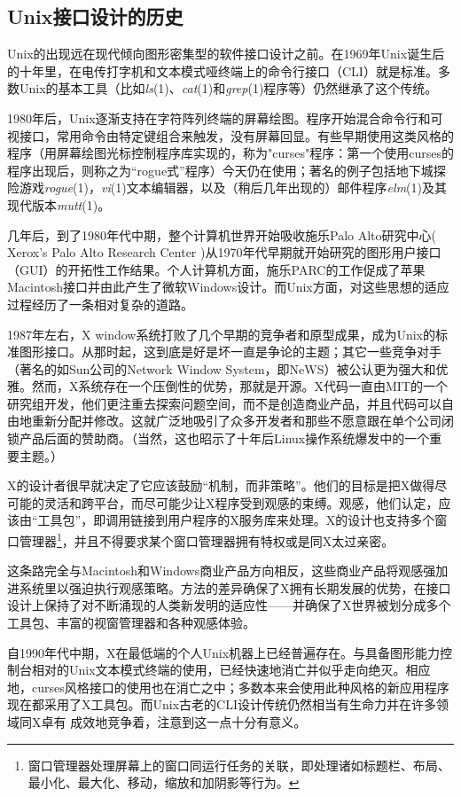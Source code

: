 \documentclass[12pt,oneside]{book}
\begin{document}
\begin{common-format}
\section{Unix接口设计的历史}
Unix的出现远在现代倾向图形密集型的软件接口设计之前。在1969年Unix诞生后的十年里，在电传打字机和文本模式哑终端上的命令行接口（CLI）就是标准。多数Unix的基本工具（比如\textit{ls}(1)、\textit{cat}(1)和\textit{grep}(1)程序等）仍然继承了这个传统。

1980年后，Unix逐渐支持在字符阵列终端的屏幕绘图。程序开始混合命令行和可视接口，常用命令由特定键组合来触发，没有屏幕回显。有些早期使用这类风格的程序（用屏幕绘图光标控制程序库实现的，称为"curses"程序：第一个使用curses的程序出现后，则称之为“rogue式”程序）今天仍在使用；著名的例子包括地下城探险游戏\textit{rogue}(1)，\textit{vi}(1)文本编辑器，以及（稍后几年出现的）邮件程序\textit{elm}(1)及其现代版本\textit{mutt}(1)。

几年后，到了1980年代中期，整个计算机世界开始吸收施乐Palo Alto研究中心( Xerox's Palo Alto Research Center )从1970年代早期就开始研究的图形用户接口（GUI）的开拓性工作结果。个人计算机方面，施乐PARC的工作促成了苹果Macintosh接口并由此产生了微软Windows设计。而Unix方面，对这些思想的适应过程经历了一条相对复杂的道路。

1987年左右，X window系统打败了几个早期的竞争者和原型成果，成为Unix的标准图形接口。从那时起，这到底是好是坏一直是争论的主题；其它一些竞争对手（著名的如Sun公司的Network Window System，即NeWS）被公认更为强大和优雅。然而，X系统存在一个压倒性的优势，那就是开源。X代码一直由MIT的一个研究组开发，他们更注重去探索问题空间，而不是创造商业产品，并且代码可以自由地重新分配并修改。这就广泛地吸引了众多开发者和那些不愿意跟在单个公司闭锁产品后面的赞助商。（当然，这也昭示了十年后Linux操作系统爆发中的一个重要主题。）

X的设计者很早就决定了它应该鼓励“机制，而非策略”。他们的目标是把X做得尽可能的灵活和跨平台，而尽可能少让X程序受到观感的束缚。观感，他们认定，应该由“工具包”，即调用链接到用户程序的X服务库来处理。X的设计也支持多个窗口管理器\footnote{窗口管理器处理屏幕上的窗口同运行任务的关联，即处理诸如标题栏、布局、最小化、最大化、移动，缩放和加阴影等行为。}，并且不得要求某个窗口管理器拥有特权或是同X太过亲密。

这条路完全与Macintosh和Windows商业产品方向相反，这些商业产品将观感强加进系统里以强迫执行观感策略。方法的差异确保了X拥有长期发展的优势，在接口设计上保持了对不断涌现的人类新发明的适应性——并确保了X世界被划分成多个工具包、丰富的视窗管理器和各种观感体验。

自1990年代中期，X在最低端的个人Unix机器上已经普遍存在。与具备图形能力控制台相对的Unix文本模式终端的使用，已经快速地消亡并似乎走向绝灭。相应地，curses风格接口的使用也在消亡之中；多数本来会使用此种风格的新应用程序现在都采用了X工具包。而Unix古老的CLI设计传统仍然相当有生命力并在许多领域同X卓有
成效地竞争着，注意到这一点十分有意义。


\end{common-format}
\end{document}
